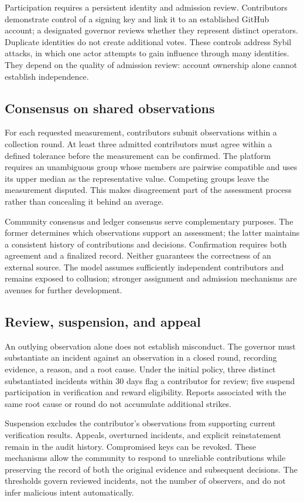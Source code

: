 \documentclass[10pt,conference]{IEEEtran}
\begin{document}
Participation requires a persistent identity and admission review. Contributors demonstrate control of a signing key and link it to an established GitHub account; a designated governor reviews whether they represent distinct operators. Duplicate identities do not create additional votes. These controls address Sybil attacks, in which one actor attempts to gain influence through many identities. They depend on the quality of admission review: account ownership alone cannot establish independence.

\subsection{Consensus on shared observations}
For each requested measurement, contributors submit observations within a collection round. At least three admitted contributors must agree within a defined tolerance before the measurement can be confirmed. The platform requires an unambiguous group whose members are pairwise compatible and uses its upper median as the representative value. Competing groups leave the measurement disputed. This makes disagreement part of the assessment process rather than concealing it behind an average.

Community consensus and ledger consensus serve complementary purposes. The former determines which observations support an assessment; the latter maintains a consistent history of contributions and decisions. Confirmation requires both agreement and a finalized record. Neither guarantees the correctness of an external source. The model assumes sufficiently independent contributors and remains exposed to collusion; stronger assignment and admission mechanisms are avenues for further development.

\subsection{Review, suspension, and appeal}
An outlying observation alone does not establish misconduct. The governor must substantiate an incident against an observation in a closed round, recording evidence, a reason, and a root cause. Under the initial policy, three distinct substantiated incidents within 30 days flag a contributor for review; five suspend participation in verification and reward eligibility. Reports associated with the same root cause or round do not accumulate additional strikes.

Suspension excludes the contributor's observations from supporting current verification results. Appeals, overturned incidents, and explicit reinstatement remain in the audit history. Compromised keys can be revoked. These mechanisms allow the community to respond to unreliable contributions while preserving the record of both the original evidence and subsequent decisions. The thresholds govern reviewed incidents, not the number of observers, and do not infer malicious intent automatically.
\end{document}
